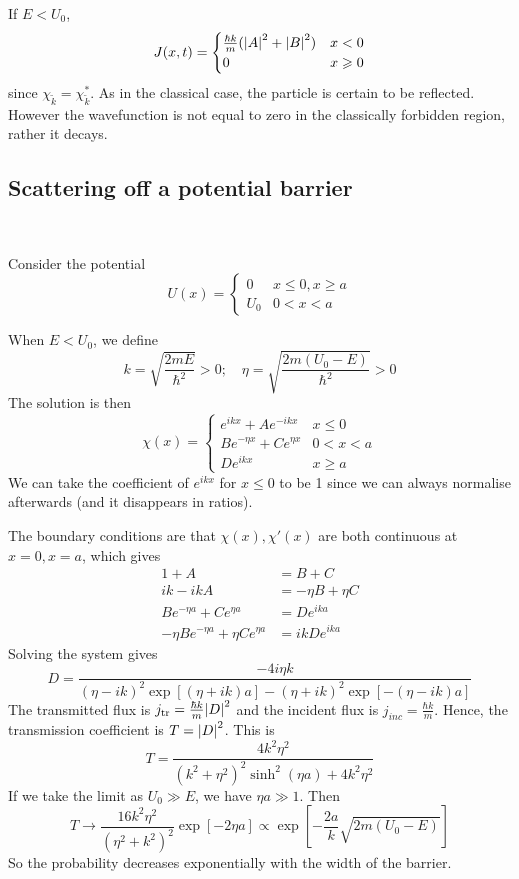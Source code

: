 \documentclass[a4paper]{article}
\begin{document}
If \( E < U_0 \),
\[
	J(x,t) =
	\begin{cases}
		\frac{\hbar k}{m} (\abs{A}^2 + \abs{B}^2) & x < 0    \\
		0                                         & x \geqslant 0
	\end{cases}
\]
since \( \chi_{\tilde k} = \chi_{\tilde k}^* \).
As in the classical case, the particle is certain to be reflected. However the wavefunction is not equal to zero in the classically forbidden region, rather it decays. 

\subsection{Scattering off a potential barrier}\ \vspace{-1.5em}
\begin{example}
    Consider the potential
\[
	U(x) = \begin{cases}
		0   & x \leq 0, x \geq a \\
		U_0 & 0 < x < a
	\end{cases}
\]
\end{example}
When \( E < U_0 \), we define
\[
	k = \sqrt{\frac{2mE}{\hbar^2}} > 0;\quad \eta = \sqrt{\frac{2m(U_0 - E)}{\hbar^2}} > 0
\]
The solution is then
\[
	\chi(x) = \begin{cases}
		e^{ikx} + Ae^{-ikx}        & x \leq 0  \\
		Be^{-\eta x} + Ce^{\eta x} & 0 < x < a \\
		De^{ikx}                   & x \geq a
	\end{cases}
\]
We can take the coefficient of $e^{ikx}$ for $x\le 0$ to be 1 since we can always normalise afterwards (and it disappears in ratios). 

The boundary conditions are that \( \chi(x) , \chi'(x) \) are both continuous at \( x = 0, x = a \), which gives
\begin{align*}
    1 + A &= B + C\\ 
    ik - ikA &= -\eta B + \eta C\\ 
	B e^{-\eta a} + C e^{\eta a} &= D e^{ika}\\ 
    -\eta B e^{-\eta a} + \eta C e^{\eta a} &= ikD e^{ika}
\end{align*}
Solving the system gives
\[
	D = \frac{-4 i \eta k}{(\eta-ik)^2 \exp[(\eta+ik)a] - (\eta+ik)^2\exp[-(\eta-ik)a]}
\]
The transmitted flux is \( j_{\text{tr}} = \frac{\hbar k}{m} \abs{D}^2 \) and the incident flux is \( j_{\textit{inc}} = \frac{\hbar k}{m} \).
Hence, the transmission coefficient is \( T = \abs{D}^2 \).
This is
\[
	T = \frac{4 k^2 \eta^2}{(k^2+\eta^2)^2 \sinh^2(\eta a) + 4 k^2 \eta^2}
\]
If we take the limit as \( U_0 \gg E \), we have \( \eta a \gg 1 \).
Then
\[
	T \to \frac{16k^2 \eta^2}{(\eta^2 + k^2)^2} \exp[-2\eta a] \propto \exp[-\frac{2a}{k} \sqrt{2m(U_0 - E)}]
\]
So the probability decreases exponentially with the width of the barrier.
\end{document}
